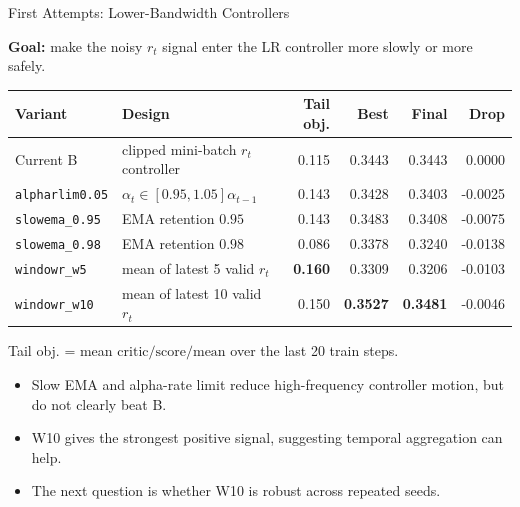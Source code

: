 \documentclass[aspectratio=169]{beamer}
\begin{document}
\begin{frame}{First Attempts: Lower-Bandwidth Controllers}
\small

\textbf{Goal:}
make the noisy \(r_t\) signal enter the LR controller more slowly or more safely.


\begin{center}
\tiny
\begin{tabular}{llrrrr}
\toprule
Variant & Design & Tail obj. & Best & Final & Drop \\
\midrule
Current B
& clipped mini-batch \(r_t\) controller
& 0.115 & 0.3443 & 0.3443 & 0.0000 \\
\texttt{alpharlim0.05}
& \(\alpha_t\in[0.95,1.05]\alpha_{t-1}\)
& 0.143 & 0.3428 & 0.3403 & -0.0025 \\
\texttt{slowema\_0.95}
& EMA retention \(0.95\)
& 0.143 & 0.3483 & 0.3408 & -0.0075 \\
\texttt{slowema\_0.98}
& EMA retention \(0.98\)
& 0.086 & 0.3378 & 0.3240 & -0.0138 \\
\texttt{windowr\_w5}
& mean of latest 5 valid \(r_t\)
& \textbf{0.160} & 0.3309 & 0.3206 & -0.0103 \\
\texttt{windowr\_w10}
& mean of latest 10 valid \(r_t\)
& 0.150 & \textbf{0.3527} & \textbf{0.3481} & -0.0046 \\
\bottomrule
\end{tabular}
\end{center}

\vspace{0.4em}

{\footnotesize\color{Muted}
Tail obj. = mean \(\mathrm{critic/score/mean}\) over the last 20 train steps.
}

\vspace{0.4em}

\begin{itemize}
  \item Slow EMA and alpha-rate limit reduce high-frequency controller motion, but do not clearly beat B.
  \item W10 gives the strongest positive signal, suggesting temporal aggregation can help.
  \item The next question is whether W10 is robust across repeated seeds.
\end{itemize}

\end{frame}
\end{document}
